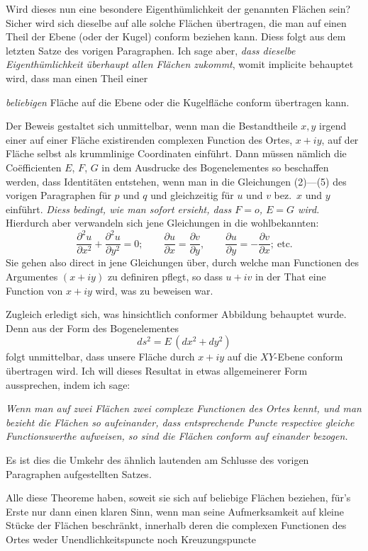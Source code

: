 \documentclass{article}
\begin{document}
Wird dieses nun eine besondere Eigenthümlichkeit der genannten Flächen sein? Sicher wird sich dieselbe auf alle solche Flächen übertragen, die man auf einen Theil der Ebene (oder der Kugel) conform beziehen kann. Diess folgt aus dem letzten Satze des vorigen Paragraphen. Ich sage aber, \emph{dass dieselbe Eigenthümlichkeit überhaupt allen Flächen zukommt}, womit implicite behauptet wird, dass man einen Theil einer

\emph{beliebigen} Fläche auf die Ebene oder die Kugelfläche conform übertragen kann.

Der Beweis gestaltet sich unmittelbar, wenn man die Bestandtheile $x, y$ irgend einer auf einer Fläche existirenden complexen Function des Ortes, $x + iy$, auf der Fläche selbst als krummlinige Coordinaten einführt. Dann müssen nämlich die Coëfficienten $E$, $F$, $G$ in dem Ausdrucke des Bogenelementes so beschaffen werden, dass Identitäten entstehen, wenn man in die Gleichungen (2)---(5) des vorigen Paragraphen für $p$ und $q$ und gleichzeitig für $u$ und $v$ bez.\ $x$ und $y$ einführt. \emph{Diess bedingt, wie man sofort ersieht, dass $F = o$, $E = G$ wird.} Hierdurch aber verwandeln sich jene Gleichungen in die wohlbekannten:
\[ \frac{\partial^{2} u}{\partial x^{2}} + \frac{\partial^{2} u}{\partial y^{2}} = 0; \qquad \frac{\partial u}{\partial x} = \frac{\partial v}{\partial y}, \qquad \frac{\partial u}{\partial y} = - \frac{\partial v}{\partial x}; \ \text{etc.} \]
Sie gehen also direct in jene Gleichungen über, durch welche man Functionen des Argumentes $(x + iy)$ zu definiren pflegt, so dass $u + iv$ in der That eine Function von $x + iy$ wird, was zu beweisen war.

Zugleich erledigt sich, was hinsichtlich conformer Abbildung behauptet wurde. Denn aus der Form des Bogenelementes
\[ ds^{2} = E\,(dx^{2} + dy^{2}) \]
folgt unmittelbar, dass unsere Fläche durch $x + iy$ auf die $XY$-Ebene conform übertragen wird. Ich will dieses Resultat in etwas allgemeinerer Form aussprechen, indem ich sage:

\emph{Wenn man auf zwei Flächen zwei complexe Functionen des Ortes kennt, und man bezieht die Flächen so aufeinander, dass entsprechende Puncte respective gleiche Functionswerthe aufweisen, so sind die Flächen conform auf einander bezogen.}

Es ist dies die Umkehr des ähnlich lautenden am Schlusse des vorigen Paragraphen aufgestellten Satzes.

Alle diese Theoreme haben, soweit sie sich auf beliebige Flächen beziehen, für's Erste nur dann einen klaren Sinn, wenn man seine Aufmerksamkeit auf kleine Stücke der Flächen beschränkt, innerhalb deren die complexen Functionen des Ortes weder Unendlichkeitspuncte noch Kreuzungspuncte
\end{document}
